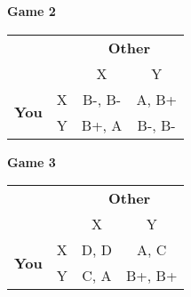 \documentclass[12pt]{article}
\begin{document}
\bigskip
\begin{large}
\textbf{Game 2}
\end{large}

\begin{center}
\begin{tabular}{l r | c c}
 & & \multicolumn{2}{c}{\textbf{Other}} \\
& & X & Y \\ \hline
\multirow{2}{*}{\textbf{You}} & X & B-, B- & A, B+ \\ & Y & B+, A & B-, B- \\
\end{tabular}
\end{center}

\bigskip
\begin{large}
\textbf{Game 3}
\end{large}

\begin{center}
\begin{tabular}{l r | c c}
 & & \multicolumn{2}{c}{\textbf{Other}} \\
& & X & Y \\ \hline
\multirow{2}{*}{\textbf{You}} & X & D, D & A, C \\ & Y & C, A & B+, B+
\end{tabular}
\end{center}
\end{document}
